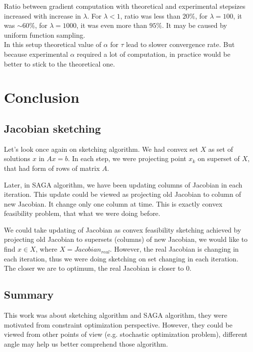 \documentclass[11pt]{book}
\begin{document}
Ratio between gradient computation with theoretical and experimental stepsizes increased with increase in $\lambda$. For $\lambda <1$, ratio was less than $20\%$, for $\lambda=100$, it was $\sim 60\%$, for $\lambda=1000$, it was even more than $95\%$. It may be caused by uniform function sampling.\\

In this setup theoretical value of $\alpha$ for $\tau$ lead to slower convergence rate. But because experimental $\alpha$ required a lot of computation, in practice would be better to stick to the theoretical one.

\chapter{Conclusion}

\section{Jacobian sketching}

Let's look once again on sketching algorithm. We had convex set $X$ as set of solutions $x$ in $Ax=b$. In each step, we were projecting point $x_k$ on superset of $X$, that had form of rows of matrix $A$.

Later, in SAGA algorithm, we have been updating columns of Jacobian in each iteration. This update could be viewed as projecting old Jacobian to column of new Jacobian. It change only one column at time. This is exactly convex feasibility problem, that what we were doing before.

We could take updating of Jacobian as convex feasibility sketching achieved by projecting old Jacobian to supersets (columns) of new Jacobian, we would like to find $x \in X$, where $X=Jacobian_{real}$. However, the real Jacobian is changing in each iteration, thus we were doing sketching on set changing in each iteration. The closer we are to optimum, the real Jacobian is closer to $0$.



\section{Summary}
This work was about sketching algorithm and SAGA algorithm, they were motivated from constraint optimization perspective. However, they could be viewed from other points of view (e.g. stochastic optimization problem), different angle may help us better comprehend those algorithm.\\
\end{document}
